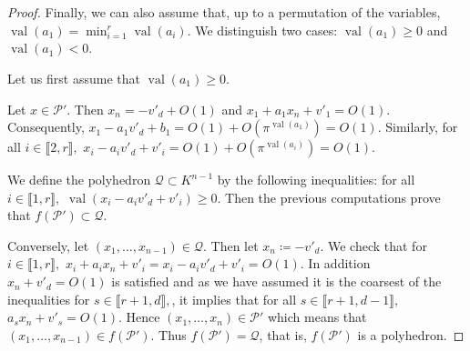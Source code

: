 \documentclass[sigconf]{acmart}
\newcommand{\PP}{\mathcal{P}}
\newcommand{\Qc}{\mathcal{Q}}
\DeclareMathOperator{\val}{val}
\providecommand{\DIFdelbegin}{} %
\providecommand{\DIFdelend}{} %
\newcommand{\DIFscaledelfig}{0.5}
\newlength{\DIFdelgraphicswidth} %
\newlength{\DIFdelgraphicsheight} %
\newcommand{\DIFdelincludegraphics}[2][]{%
\sbox{\DIFdelgraphicsbox}{\DIFOincludegraphics[#1]{#2}}%
\settoboxwidth{\DIFdelgraphicswidth}{\DIFdelgraphicsbox} %
\settoboxtotalheight{\DIFdelgraphicsheight}{\DIFdelgraphicsbox} %
\scalebox{\DIFscaledelfig}{%
\parbox[b]{\DIFdelgraphicswidth}{\usebox{\DIFdelgraphicsbox}\\[-\baselineskip] \rule{\DIFdelgraphicswidth}{0em}}\llap{\resizebox{\DIFdelgraphicswidth}{\DIFdelgraphicsheight}{%
\setlength{\unitlength}{\DIFdelgraphicswidth}%
\begin{picture}(1,1)%
\thicklines\linethickness{2pt} %
{\color[rgb]{1,0,0}\put(0,0){\framebox(1,1){}}}%
{\color[rgb]{1,0,0}\put(0,0){\line( 1,1){1}}}%
{\color[rgb]{1,0,0}\put(0,1){\line(1,-1){1}}}%
\end{picture}%
}\hspace*{3pt}}} %
} %
\DeclareRobustCommand{\DIFdelbegin}{\DIFOdelbegin \let\includegraphics\DIFdelincludegraphics} %
\DeclareRobustCommand{\DIFdelend}{\DIFOaddend \let\includegraphics\DIFOincludegraphics} %
\begin{document}
\begin{proof}
Finally, we can also assume that, up to a permutation of the variables, $\val(a_1)= \min_{i=1}^{r} \val(a_i).$
We distinguish two cases: $\val(a_1) \geq 0$ and $\val(a_1)<0.$
\DIFdelbegin %

\DIFdelend Let us first assume that $\val(a_1) \geq 0$.

Let $x \in \PP'$.
Then $x_n=-v'_d+O(1)$
and $x_1+a_1 x_n+v'_1=O(1).$
Consequently, $x_1-a_1 v'_d +b_1=O(1)+O(\pi^{\val(a_1)})=O(1).$
Similarly, for all $i \in \llbracket 2,r \rrbracket,$
$x_i-a_i v'_d+v'_i=O(1)+O(\pi^{\val(a_i)})=O(1).$

We define the polyhedron $\Qc \subset K^{n-1}$ by the following inequalities:
 for all $i \in \llbracket 1,r \rrbracket,$
$\val(x_i-a_iv'_d+v'_i) \geq 0$. Then the previous computations prove that $f(\PP')\subset \Qc.$

Conversely, let $(x_1,\dots,x_{n-1}) \in \Qc.$
Then let $x_n \coloneq -v'_d.$
We check that for $i \in \llbracket 1,r \rrbracket,$
$x_i+a_ix_n+v'_i=x_i-a_iv'_d+v'_i=O(1).$
In addition $x_n+v'_d=O(1)$ is satisfied
and as we have assumed it is the coarsest of the inequalities
for $s \in \llbracket r+1,d \rrbracket,$, it implies that 
for all $s \in \llbracket r+1,d-1 \rrbracket,$
$a_s x_n+v'_s=O(1)$.
Hence $(x_1,\dots,x_n) \in \PP'$
which means that $(x_1,\dots,x_{n-1}) \in f(\PP').$
Thus $f(\PP')= \Qc$, that is, $f(\PP')$ is a polyhedron.


\end{proof}
\end{document}
